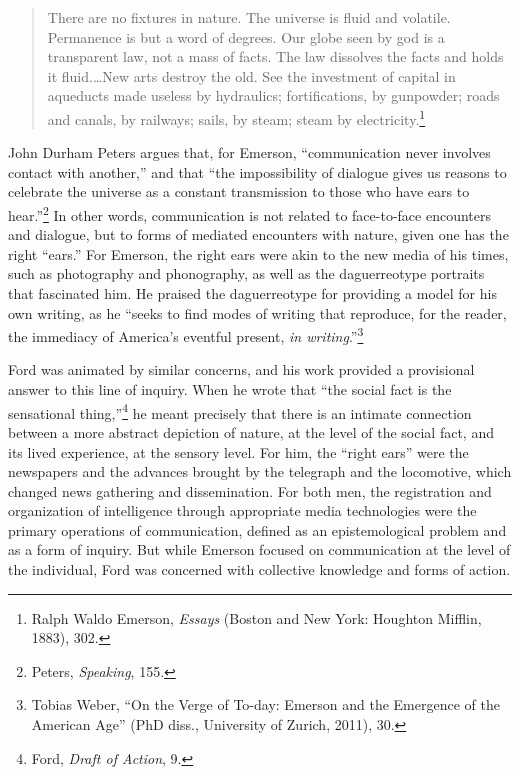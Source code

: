 \documentclass[twoside,symmetric,nobib,justified]{tufte-book}
\begin{document}
\newpage\begin{quote}
There are no fixtures in nature. The universe is fluid and volatile.
Permanence is but a word of degrees. Our globe seen by god is a
transparent law, not a mass of facts. The law dissolves the facts and
holds it fluid.\ldots New arts destroy the old. See the investment of
capital in aqueducts made useless by hydraulics; fortifications, by
gunpowder; roads and canals, by railways; sails, by steam; steam by
electricity.\footnote{Ralph Waldo Emerson, \emph{Essays} (Boston and New
  York: Houghton Mifflin, 1883), 302.}
\end{quote}

\noindent John Durham Peters argues that, for Emerson, ``communication never
involves contact with another,'' and that ``the impossibility of
dialogue gives us reasons to celebrate the universe as a constant
transmission to those who have ears to hear.''\footnote{Peters,
  \emph{Speaking}, 155.} In other words, communication is not related to
face-to-face encounters and dialogue, but to forms of mediated
encounters with nature, given one has the right ``ears.'' For Emerson,
the right ears were akin to the new media of his times, such as
photography and phonography, as well as the daguerreotype portraits that
fascinated him. He praised the daguerreotype for providing a model for
his own writing, as he ``seeks to find modes of writing that reproduce,
for the reader, the immediacy of America's eventful present, \emph{in
writing}.''\footnote{Tobias Weber, ``On the Verge of To-day: Emerson and
  the Emergence of the American Age'' (PhD diss., University of Zurich,
  2011), 30.}

Ford was animated by similar concerns, and his work provided a
provisional answer to this line of inquiry. When he wrote that ``the
social fact is the sensational thing,''\footnote{Ford, \emph{Draft of
  Action}, 9.} he meant precisely that there is an intimate connection
between a more abstract depiction of nature, at the level of the social
fact, and its lived experience, at the sensory level. For him, the
``right ears'' were the newspapers and the advances brought by the
telegraph and the locomotive, which changed news gathering and
dissemination. For both men, the registration and organization of
intelligence through appropriate media technologies were the primary
operations of communication, defined as an epistemological problem and
as a form of inquiry. But while Emerson focused on communication at the
level of the individual, Ford was concerned with collective knowledge
and forms of action.
\end{document}
